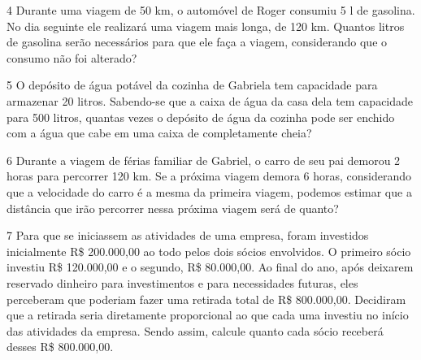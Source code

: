 \bigskip\bigskip

\num{4} Durante uma viagem de 50 km, o automóvel de Roger consumiu 5 l de
gasolina. No dia seguinte ele realizará uma viagem mais longa, de 120 km.
Quantos litros de gasolina serão necessários para que ele faça a viagem,
considerando que o consumo não foi alterado?

\bigskip\bigskip

\num{5} O depósito de água potável da cozinha de Gabriela tem capacidade
para armazenar 20 litros. Sabendo-se que a caixa de água da casa dela tem capacidade para 500 litros, quantas vezes o depósito de
água da cozinha pode ser enchido com a água que cabe em uma caixa de completamente cheia?

\bigskip\bigskip

\num{6} Durante a viagem de férias familiar de Gabriel, o carro de seu pai
demorou 2 horas para percorrer 120 km. Se a próxima viagem demora 6
horas, considerando que a velocidade do carro é a mesma da primeira
viagem, podemos estimar que a distância que irão percorrer nessa próxima viagem será de quanto?


\pagebreak
\num{7} Para que se iniciassem as atividades de uma empresa, foram investidos
inicialmente R\$ 200.000,00 ao todo pelos dois sócios envolvidos. O primeiro
sócio investiu R\$ 120.000,00 e o segundo, R\$ 80.000,00. Ao final do ano,
após deixarem reservado dinheiro para investimentos e para necessidades
futuras, eles perceberam que poderiam fazer uma retirada total de R\$ 800.000,00. Decidiram que a retirada seria diretamente proporcional ao que
cada uma investiu no início das atividades da empresa. Sendo assim,
calcule quanto cada sócio receberá desses R\$ 800.000,00.

